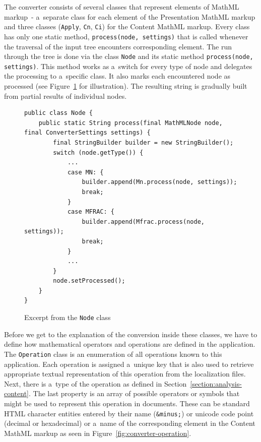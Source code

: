 \documentclass[11pt,oneside,final]{fithesis2}
\begin{document}
The converter consists of several classes that represent elements of MathML markup~- a~separate class for each element of the Presentation MathML markup and three classes (\texttt{Apply}, \texttt{Cn}, \texttt{Ci}) for the Content MathML markup. Every class has only one static method, \texttt{process(node, settings)} that is called whenever the traversal of the input tree encounters corresponding element. The run through the tree is done via the class \texttt{Node} and its static method \texttt{process(node, settings)}. This method works as a~switch for every type of node and delegates the processing to a~specific class. It also marks each encountered node as processed (see Figure~\ref{fig:converter-node} for illustration). The resulting string is gradually built from partial results of individual nodes.

\begin{figure}[!ht]
\begin{lstlisting}
public class Node {
	public static String process(final MathMLNode node, final ConverterSettings settings) {
		final StringBuilder builder = new StringBuilder();
        switch (node.getType()) {
            ...
            case MN: {
                builder.append(Mn.process(node, settings));
                break;
            }
            case MFRAC: {    
                builder.append(Mfrac.process(node, settings));
                break;
            }
            ...
        }
        node.setProcessed();
    }    
}
\end{lstlisting}
\caption{Excerpt from the \texttt{Node} class}
\label{fig:converter-node}
\end{figure}

Before we get to the explanation of the conversion inside these classes, we have to define how mathematical operators and operations are defined in the application. The \texttt{Operation} class is an enumeration of all operations known to this application. Each operation is assigned a~unique key that is also used to retrieve appropriate textual representation of this operation from the localization files. Next, there is a~type of the operation as defined in Section~\ref{section:analysis-content}. The last property is an array of possible operators or symbols that might be used to represent this operation in documents. These can be standard HTML character entities entered by their name (\texttt{\&minus;}) or unicode code point (decimal or hexadecimal) or a~name of the corresponding element in the Content MathML markup as seen in Figure~\ref{fig:converter-operation}.
\end{document}
